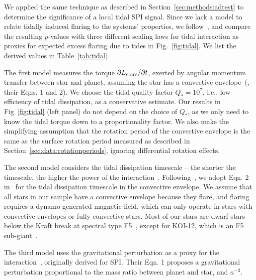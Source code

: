 \documentclass[twocolumn]{aastex631}
\begin{document}
We applied the same technique as described in Section~\ref{sec:methods:adtest} to determine the significance of a local tidal SPI signal. Since we lack a model to relate tidally induced flaring to the systems' properties, we follow~\citet{ilic2022tidal}, and compare the resulting $p$-values with three different scaling laws for tidal interaction as proxies for expected excess flaring due to tides in Fig.~\ref{fig:tidal}. We list the derived values in Table~\ref{tab:tidal}. 

The first model measures the torque $\partial L_{\rm conv} / \partial t$, exerted by angular momentum transfer between star and planet, assuming the star has a convective envelope~(\citealt{penev2012constraining}, their Eqns. 1 and 2). We choose the tidal quality factor $Q_*=10^7$, i.e., low efficiency of tidal dissipation, as a conservative estimate. Our results in Fig~\ref{fig:tidal} (left panel) do not depend on the choice of $Q_*$, as we only need to know the tidal torque down to a proportionality factor. We also make the simplifying assumption that the rotation period of the convective envelope is the same as the surface rotation period measured as described in Section~\ref{sec:data:rotationperiods}, ignoring differential rotation effects.

The second model considers the tidal dissipation timescale -- the shorter the timescale, the higher the power of the interaction~\citep{zahn1977tidal}. Following~\citet{ilic2022tidal}, we adopt Eqn. 2 in~\citet{albrecht2012obliquities} for the tidal dissipation timescale in the convective envelope. We assume that all stars in our sample have a convective envelope because they flare, and flaring requires a dynamo-generated magnetic field, which can only operate in stars with convective envelopes or fully convective stars. Most of our stars are dwarf stars below the Kraft break at spectral type F5~\citep{kraft1967studies}, except for KOI-12, which is an F5 sub-giant~\citep{frasca2016activity}.

The third model uses the gravitational perturbation as a proxy for the interaction~\citep{cuntz2000stellar}, originally derived for SPI. Their Eqn. 1 proposes a gravitational perturbation proportional to the mass ratio between planet and star, and $a^{-3}$. 
\end{document}
